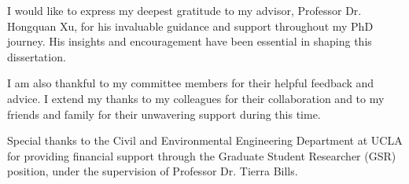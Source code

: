 I would like to express my deepest gratitude to my advisor, Professor Dr. Hongquan Xu, for his invaluable guidance and support throughout my PhD journey. His insights and encouragement have been essential in shaping this dissertation.

I am also thankful to my committee members for their helpful feedback and advice. I extend my thanks to my colleagues for their collaboration and to my friends and family for their unwavering support during this time.

Special thanks to the Civil and Environmental Engineering Department at UCLA for providing financial support through the Graduate Student Researcher (GSR) position, under the supervision of Professor Dr. Tierra Bills.
